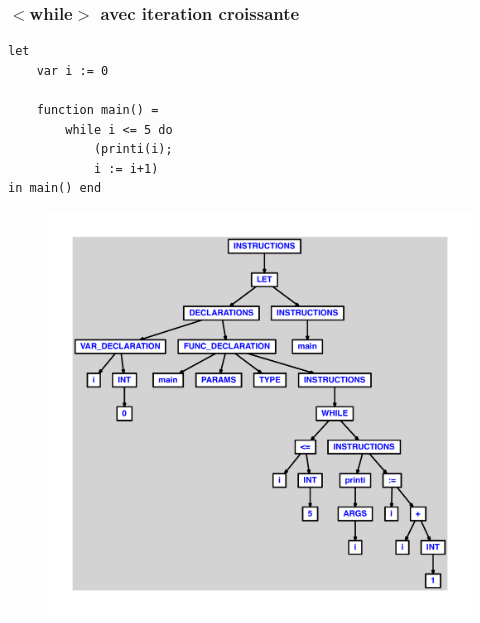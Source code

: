 \documentclass{article}
\begin{document}
\subsubsection{$ < $while$ > $ avec iteration croissante}
\begin{lstlisting}
let
	var i := 0

	function main() =
		while i <= 5 do
			(printi(i);
			i := i+1)
in main() end
\end{lstlisting}
\newpage
\begin{figure}[H]
\centering
\includegraphics[max width=\textwidth]{ast/ast_329.pdf}
\end{figure}
\newpage
\end{document}
